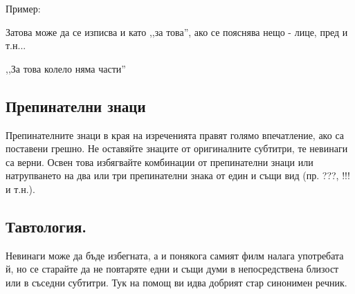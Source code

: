 Пример:

Затова може да се изписва и като ,,за това'', ако се пояснява нещо - лице, пред и т.н...

,,За това колело няма части''

\subsection{Препинателни знаци}
Препинателните знаци в края на изреченията правят голямо впечатление, ако са поставени грешно. Не оставяйте знаците от оригиналните субтитри, те невинаги са верни. Освен това избягвайте комбинации от препинателни знаци или натрупването на два или три препинателни знака от един и същи вид (пр. ???, !!! и т.н.).

\subsection{Тавтология.}
Невинаги може да бъде избегната, а и понякога самият филм налага употребата й, но се старайте да не повтаряте едни и същи думи в непосредствена близост или в съседни субтитри. Тук на помощ ви идва добрият стар синонимен речник.

